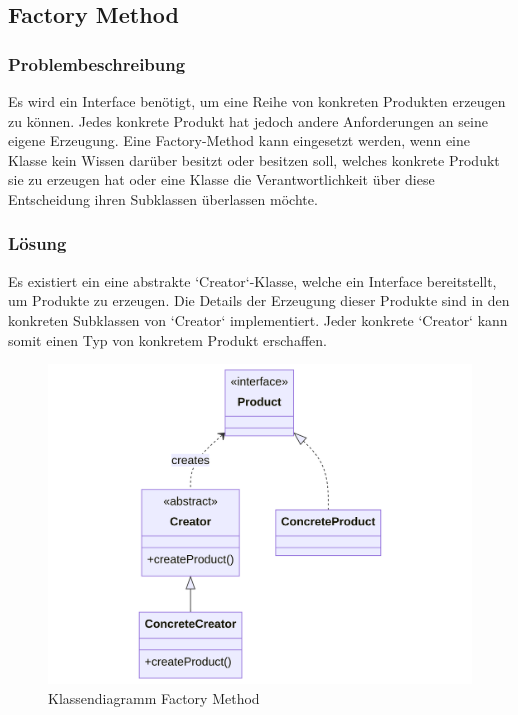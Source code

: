 \subsection{Factory Method}

\subsubsection*{Problembeschreibung}

Es wird ein Interface benötigt, um eine Reihe von konkreten Produkten erzeugen zu können. Jedes konkrete Produkt hat jedoch andere Anforderungen an seine eigene Erzeugung. Eine Factory-Method kann eingesetzt werden, wenn eine Klasse kein Wissen darüber besitzt oder besitzen soll, welches konkrete Produkt sie zu erzeugen hat oder eine Klasse die Verantwortlichkeit über diese Entscheidung ihren Subklassen überlassen möchte.

\subsubsection*{Lösung}

Es existiert ein eine abstrakte `Creator`-Klasse, welche ein Interface bereitstellt, um Produkte zu erzeugen. Die Details der Erzeugung dieser Produkte sind in den konkreten Subklassen von `Creator` implementiert. Jeder konkrete `Creator` kann somit einen Typ von konkretem Produkt erschaffen.

\begin{figure}[!hb]
	\centering
	\includegraphics[width=0.75\linewidth]{images/patterns/factory-method-class.png}
	\caption{Klassendiagramm Factory Method}
	\label{fig:factory-method-class}
\end{figure}

